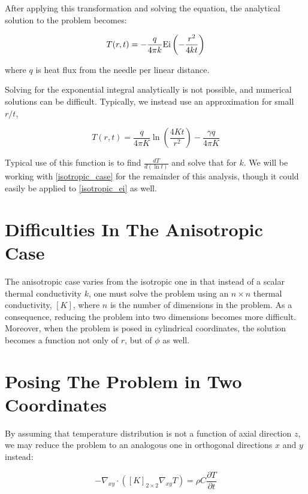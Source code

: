 After applying this transformation and solving the equation, the analytical
solution to the problem becomes:

\begin{equation}
\label{isotropic_ei}
T(r,t) = - \frac{q}{4\pi k}\textrm{Ei}\left(-\frac{r^2}{4kt}\right)
\end{equation}

where \(q\) is heat flux from the needle per linear distance.

Solving for the exponential integral analytically is not possible, and numerical
solutions can be difficult. Typically, we instead use an approximation for small
\(r/t\),

\begin{equation}
\label{isotropic_case}
T(r,t) = \frac{q}{4\pi K}\ln\left(\frac{4Kt}{r^2}\right) - \frac{\gamma q}{4\pi K}
\end{equation}

Typical use of this function is to find \(\frac{dT}{d(\ln t)}\) and solve that
for \(k\). We will be working with \ref{isotropic_case} for the remainder of
this analysis, though it could easily be applied to \ref{isotropic_ei} as well.


\section{Difficulties In The Anisotropic Case}
\label{sec:analytical-np:anisotropic-diff}


The anisotropic case varies from the isotropic one in that instead of a scalar 
thermal conductivity \(k\), one must solve the problem using an \(n \times n\)
thermal conductivity, \([K]\), where \(n\) is the number of dimensions in the
problem. As a consequence, reducing the problem into two dimensions becomes more
difficult. Moreover, when the problem is posed in cylindrical coordinates, the
solution becomes a function not only of \(r\), but of \(\phi\) as well.

\section{Posing The Problem in Two Coordinates}
\label{sec:analytical-np:2D}

By assuming that temperature distribution is not a function of axial direction
\(z\), we may reduce the problem to an analogous one in orthogonal directions
\(x\) and \(y\) instead:

\begin{equation}
-\nabla_{xy} \cdot \left([K]_{2 \times 2}\nabla_{xy} T \right)= \rho C\frac{\partial T}{\partial t}
\end{equation}

